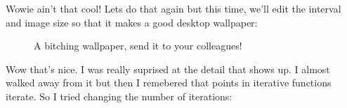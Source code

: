 \documentclass[letterpaper,12pt]{article}
\begin{document}
Wowie ain't that cool! Lets do that again but this time, we'll edit the interval and image size so that it makes a good desktop wallpaper:
\pagebreak
\begin{figure}[h]
	\noindent{}
	\centering
	\caption{A bitching wallpaper, send it to your colleagues!}
	\centering
\end{figure}

Wow that's nice. I was really suprised at the detail that shows up.
I almost walked away from it but then I remebered that points in iterative functions iterate. So I tried changing the number of iterations:
\end{document}
